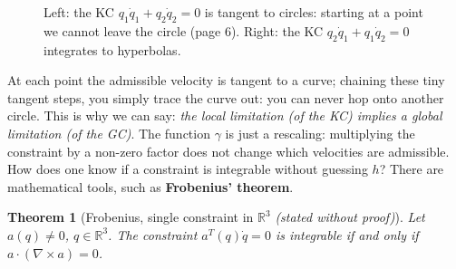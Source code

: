 \documentclass[11pt,a4paper]{article}
\theoremstyle{definition}
\theoremstyle{plain}
\newtheorem{theorem}[definition]{Theorem}
\theoremstyle{remark}
\begin{document}
\begin{figure}[H]
\centering
{}
\caption{Left: the KC $q_1\dot q_1+q_2\dot q_2=0$ is tangent to circles: starting at a point we cannot leave the circle (page 6). Right: the KC $q_2\dot q_1+q_1\dot q_2=0$ integrates to hyperbolas.}
\end{figure}
 
\begin{intuition}
At each point the admissible velocity is tangent to a curve; chaining these tiny tangent steps, you simply trace the curve out: you can never hop onto another circle. This is why we can say: \emph{the local limitation (of the KC) implies a global limitation (of the GC)}. The function $\gamma$ is just a rescaling: multiplying the constraint by a non-zero factor does not change which velocities are admissible. How does one know if a constraint is integrable without guessing $h$? There are mathematical tools, such as \textbf{Frobenius' theorem}.
\end{intuition}
 
\begin{theorem}[Frobenius, single constraint in $\mathbb R^3$ \emph{(stated without proof)}]\label{thm:frob}
Let $a(q)\neq0$, $q\in\mathbb R^3$. The constraint $a^{T}(q)\dot q=0$ is integrable if and only if $a\cdot(\nabla\times a)=0$.
\end{theorem}
 
\end{document}
